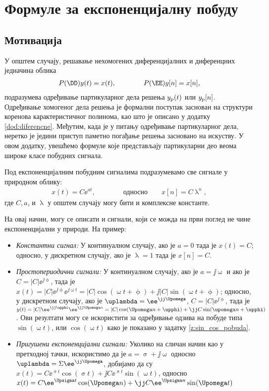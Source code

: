 \chapter{Формуле за експоненцијалну побуду} \label{dod:exp_response}

\section*{Мотивација}

У општем случају, решавање нехомогених диференцијалних и диференцних једначина облика 
\begin{eqnarray}
    P(\DD) y(t) = x(t), \qquad\qquad P(\EE)y[n] = x[n],
\end{eqnarray}
подразумева одређивање партикуларног дела решења $y_{\rm p}(t)$ или $y_{\rm p}[n]$. 
Одређивање хомогеног дела решења је формални поступак заснован на структури  коренова карактеристичног полинома, као што је описано
у додатку \ref{dod:diferencne}. Међутим, када је у питању одређивање партикуларног дела, неретко је једини приступ паметно погађање
решења засновано на искуству. У овом додатку, увешћемо формуле које представљају партикуларни део веома широке класе побудних сигнала. 

Под експоненцијалним побудним сигналима подразумевамо све сигнале у природном облику:
\begin{eqnarray}
    x(t) = C \ee^{at}, \qquad\qquad \text{односно}  \quad\quad x[n] = C \uplambda^n,
\end{eqnarray}
где $C, a$, и $\uplambda$ у општем случају могу бити и комплексне константе. 

На овај начин, могу се описати и сигнали, који се можда на први поглед не чине експоненцијални у природи. На пример:
\begin{itemize}
    \item \emph{Константни сигнал:} У континуалном случају, ако је $a = 0$ тада је $x(t) = C$; односно, у дискретном случају, 
    ако је $\uplambda = 1$ тада је $x[n] = C$.
    \item \emph{Простопериодични сигнали:} У континуалном случају, ако је $a = \jj\upomega$ и ако је 
    $C = |C| \ee^{\jj\upphi}$, тада је 
    $x(t) = |C| \ee^{\jj\upphi} \ee^{\jj\upomega t} = |C|\cos(\upomega t + \upphi) + \jj |C| \sin(\upomega t + \upphi)$; односно, у дискретном случају, 
    ако је $\uplambda = \ee^{\jj\Upomega}$,  $C = |C| \ee^{\jj\upphi}$, тада је $y(t) =
    |C| \ee^{\jj\upphi} \ee^{\jj\Upomega n} = |C|\cos(\Upomega n + \upphi) + \jj C \sin(\upomega n + \upphi)$.
    Ови резултати могу се искористити за одређивање одзива на побуде типа $\sin(\upomega t)$, или 
    $\cos(\upomega t)$ како је показано у задатку \ref{z:sin_cos_pobuda}.
    \item \emph{Пригушени експоненцијални сигнали:} Уколико на сличан начин као у претходној тачки, искористимо да је 
    $a = \upsigma + \jj\upomega$ односно $\uplambda = \Sigma \ee^{\jj\Upomega}$, добијамо да су 
    $x(t) = C\ee^{\upsigma t}\cos(\upsigma t)+ \jj C\ee^{\upsigma t}\sin(\upomega t)$, односно
    $x(t) = C\ee^{\Upsigma t}\cos(\Upomega n)+ \jj C\ee^{\Upsigma n}\sin(\Upomega t)$
\end{itemize}

